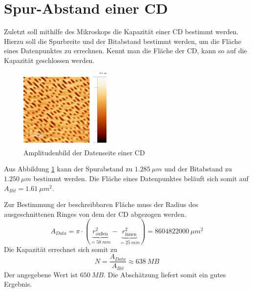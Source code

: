     \section{Spur-Abstand einer CD}

Zuletzt soll mithilfe des Mikroskops die Kapazität einer CD bestimmt werden. Hierzu
soll die Spurbreite und der Bitabstand bestimmt werden, um die Fläche eines 
Datenpunktes zu errechnen. Kennt man die Fläche der CD, kann so auf die Kapazität 
geschlossen werden. \par
\begin{figure}[h]
    \centering
    \includegraphics[width=0.4\textwidth]{Mess/cd_paint.png}
    \caption{Amplitudenbild der Datenseite einer CD}
    \label{cd}
\end{figure}
Aus Abbildung \ref{cd} kann der Spurabstand zu $\SI{1,285}{\mu m}$ und der 
Bitabstand zu $\SI{1,250}{\mu m}$ bestimmt werden. Die Fläche eines Datenpunktes
beläuft sich somit auf $A_{Bit} = \SI{1,61}{\mu m^2}$. \par
Zur Bestimmung der beschreibbaren Fläche muss der Radius des ausgeschnittenen
Ringes von dem der CD abgezogen werden. 
\[
    A_{Data} = \pi \cdot \left( \underset{=\SI{58}{mm}}{\underbrace{r_{\text{außen}}^2}}
    - \underset{=\SI{25}{mm}}{\underbrace{r_{\text{innen}}^2 }} \right)
    = \SI{8604822000}{\mu m^2}
\]
Die Kapazität errechnet sich somit zu
\[
    N = \frac{A_{Data}}{A_{Bit}} \approx \SI{638}{MB}
\]
Der angegebene Wert ist $\SI{650}{MB}$. Die Abschätzung liefert somit ein gutes Ergebnis.
